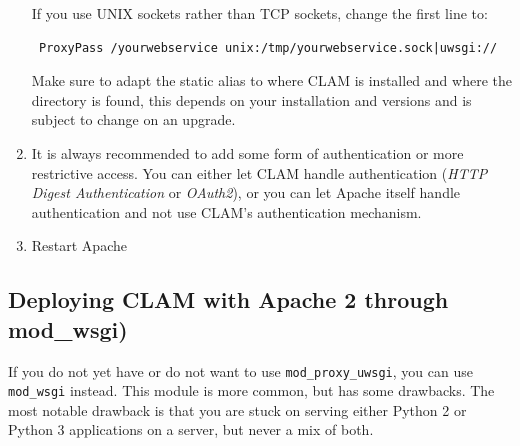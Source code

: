 \documentclass[a4paper,12pt,twoside,openright]{report}
\begin{document}
\begin{enumerate}[leftmargin=5mm]
If you use UNIX sockets rather than TCP sockets, change the first line to:
{\small
\begin{verbatim}
 ProxyPass /yourwebservice unix:/tmp/yourwebservice.sock|uwsgi://
\end{verbatim}
}

Make sure to adapt the static alias to where CLAM is
installed and where the  directory is found, this depends on your
installation and versions and is subject to change on an upgrade.

\item It is always recommended to add some form of authentication or more restrictive
access. You can either let CLAM handle authentication (\emph{HTTP Digest
Authentication} or \emph{OAuth2}), or you can let Apache itself handle
authentication and not use CLAM's authentication mechanism.  
\item Restart Apache
\end{enumerate}


\subsection{Deploying CLAM with Apache 2 through mod\_wsgi)}

If you do not yet have or do not want to use \texttt{mod\_proxy\_uwsgi}, you can use
\texttt{mod\_wsgi} instead. This module is more common, but has some drawbacks.
The most notable drawback is that you are stuck on serving either Python 2 or Python
3 applications on a server, but never a mix of both.
\end{document}
